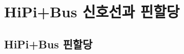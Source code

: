 %
%
%
%
\chapter{HiPi+Bus 신호선과 핀할당}
%

%
\clearpage
\section{HiPi+Bus 핀할당}\label{apsec:pin-assign}

%
%
